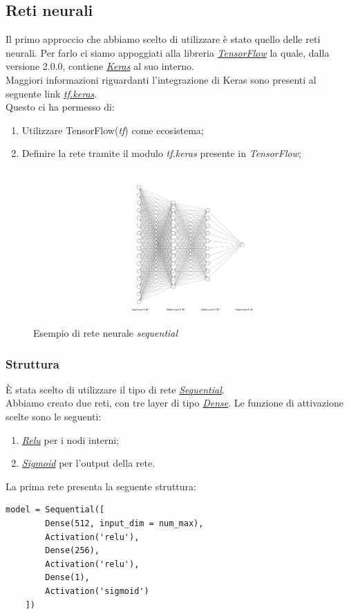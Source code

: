 \subsection{Reti neurali}
Il primo approccio che abbiamo scelto di utilizzare è stato quello delle reti neurali.
Per farlo ci siamo appoggiati alla libreria \href{https://www.tensorflow.org/}{\textit{TensorFlow}} la quale, dalla versione 2.0.0, contiene \href{https://keras.io/}{\textit{Keras}} al suo interno.\\
Maggiori informazioni riguardanti l'integrazione di Keras sono presenti al seguente link \href{https://www.tensorflow.org/guide/keras}{\textit{tf.keras}}.\\ 
Questo ci ha permesso di:
\begin{enumerate}
	\item Utilizzare TensorFlow(\textit{tf}) come ecosistema;
	\item Definire la rete tramite il modulo \textit{tf.keras} presente in \textit{TensorFlow};
\end{enumerate} 
\begin{figure}[H]
	\includegraphics[keepaspectratio = true, scale=0.4,center]{img/nnExample.png}
	\caption{Esempio di rete neurale \textit{sequential}}
\end{figure}

\subsubsection{Struttura}
È stata scelto di utilizzare il tipo di rete \href{https://keras.io/getting-started/sequential-model-guide/}{\textit{Sequential}}.\\ 
Abbiamo creato due reti, con tre layer di tipo \href{https://keras.io/layers/core/}{\textit{Dense}}.
Le funzione di attivazione scelte sono le seguenti:
\begin{enumerate}
	\item \href{https://keras.io/activations/#relu}{\textit{Relu}} per i nodi interni;
	\item \href{https://keras.io/activations/#sigmoid}{\textit{Sigmoid}} per l'output della rete.
\end{enumerate}
La prima rete presenta la seguente struttura:
\begin{lstlisting}[backgroundcolor = \color{white}]
		model = Sequential([
        Dense(512, input_dim = num_max), 
        Activation('relu'),
        Dense(256), 
        Activation('relu'),
        Dense(1),
        Activation('sigmoid')
    ])
\end{lstlisting}


